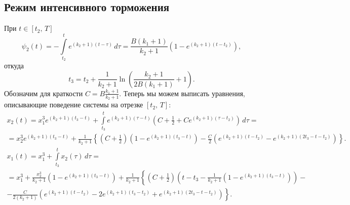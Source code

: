 \subsection{Режим интенсивного торможения}

При $t \in [t_2,\,T]$
$$
        \psi_2(t) 
= 
        -\int\limits_{t_2}^{t}
                e^{(k_2+1)(t-\tau)}
        \,d\tau
=
        \frac{B(k_1+1)}{k_2+1}
        \left(
                1 - e^{(k_2+1)(t-t_2)}
        \right),
$$
откуда
$$
        t_3
=
        t_2 + \frac{1}{k_2 + 1}
        \ln \left(
                \frac{k_2 + 1}{2B(k_1 + 1)} + 1
        \right).
$$
Обозначим для краткости $C = B \frac{k_1 + 1}{k_2 + 1}$.
Теперь мы можем выписать уравнения, описывающие поведение системы на отрезке $[t_2,\,T]$:
\begin{multline}
        x_2(t)
=
        x_1^3 e^{(k_2 + 1)(t_3 - t)} +
        \int\limits_{t_3}^{t}
                e^{(k_2 + 1)(\tau - t)}
                \left(
                        C + \frac{1}{2} + Ce^{(k_2 + 1)(\tau - t_2)}
                \right)
                \,d\tau
=\\=
        x_2^3 e^{(k_2 + 1)(t_3 - t)} +
        \frac{1}{k_2 + 1}
        \left\{
                \left(
                        C + \frac{1}{2}
                \right)
                \left(
                        1 - e^{(k_2 + 1)(t_3 - t)}
                \right)
                - \frac{C}{2}
                \left(
                        e^{(k_2 + 1)(t - t_2)} -
                        e^{(k_2 + 1)(2t_3 -t - t_2)}
                \right)
        \right\}. 
\end{multline}
\begin{multline}
        x_1(t) = x_1^3 + \int\limits_{t_3}^{t} x_2(\tau)\,d\tau
=\\=
        x_1^3 + \frac{x_2^3}{k_2 + 1}
        \left(
                1 - e^{(k_2+1)(t_3-t)}
        \right)
        +
        \frac{1}{k_2+1}
        \left\{
                \left(
                        C + \frac{1}{2}
                \right)
                \left(
                        t - t_3 - \frac{1}{k_2+1}
                        \left(
                                1 - e^{(k_2+1)(t_3-t)}
                        \right)
                \right)
\right.-\\-\left.
                \frac{C}{2(k_2+1)}
                \left(
                        e^{(k_2+1)(t-t_2)}
                        -
                        2e^{(k_2+1)(t_3-t_2)}
                        +
                        e^{(k_2+1)(2t_3-t-t_2)}
                \right)
        \right\}.
\end{multline}

